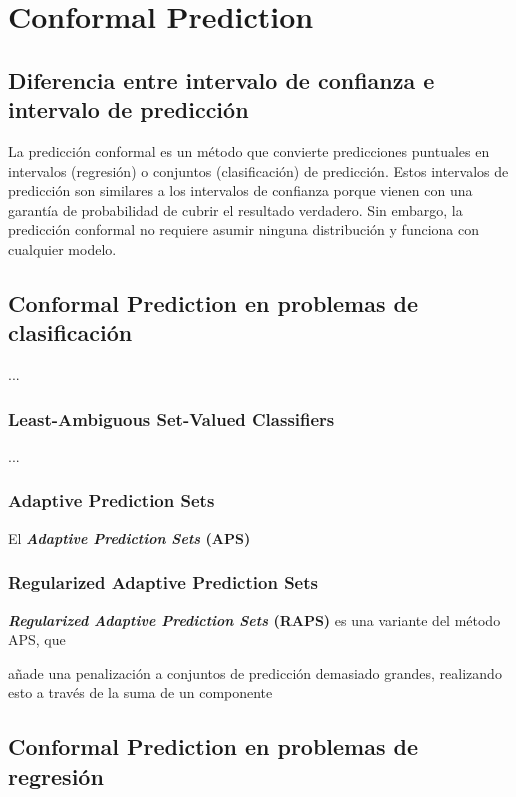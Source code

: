 
\section{Conformal Prediction}


\subsection{Diferencia entre intervalo de confianza e intervalo de predicción}

La predicción conformal es un método que convierte predicciones puntuales en intervalos (regresión) o conjuntos 
(clasificación) de predicción. Estos intervalos de predicción son similares a los intervalos de confianza porque 
vienen con una garantía de probabilidad de cubrir el resultado verdadero. Sin embargo, la predicción conformal
no requiere asumir ninguna distribución y funciona con cualquier modelo.


\subsection{Conformal Prediction en problemas de clasificación}

...

\subsubsection{Least-Ambiguous Set-Valued Classifiers}

...

\subsubsection{Adaptive Prediction Sets}

El \textbf{\textit{Adaptive Prediction Sets} (APS)} \cite{romano2020}

\subsubsection{Regularized Adaptive Prediction Sets}

\textbf{\textit{Regularized Adaptive Prediction Sets} (RAPS)} \cite{angelopoulos2020} es una variante del método APS, 
que 

añade una penalización a conjuntos de predicción demasiado grandes, realizando esto a través 
de la suma de un componente 




\subsection{Conformal Prediction en problemas de regresión}


